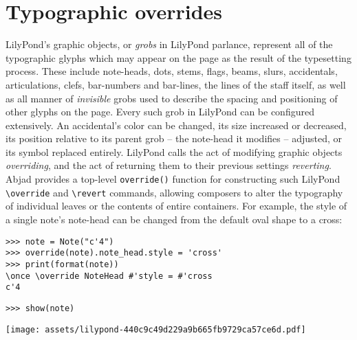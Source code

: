 \section{Typographic overrides}
\label{sec:typographic-overrides}

LilyPond's graphic objects, or \emph{grobs} in LilyPond parlance, represent all
of the typographic glyphs which may appear on the page as the result of the
typesetting process. These include note-heads, dots, stems, flags, beams,
slurs, accidentals, articulations, clefs, bar-numbers and bar-lines, the lines
of the staff itself, as well as all manner of \emph{invisible} grobs used
to describe the spacing and positioning of other glyphs on the page. Every such
grob in LilyPond can be configured extensively. An accidental's color can be
changed, its size increased or decreased, its position relative to its parent
grob -- the note-head it modifies -- adjusted, or its symbol replaced entirely.
LilyPond calls the act of modifying graphic objects \emph{overriding}, and the
act of returning them to their previous settings \emph{reverting}. Abjad
provides a top-level \texttt{override()} function for constructing such
LilyPond \texttt{\textbackslash{}override} and \texttt{\textbackslash{}revert}
commands, allowing composers to alter the typography of individual leaves or
the contents of entire containers. For example, the style of a single note's
note-head can be changed from the default oval shape to a cross:

\begin{comment}
<abjad>
note = Note("c'4")
override(note).note_head.style = 'cross'
print(format(note))
show(note)
</abjad>
\end{comment}

\begin{abjadbookoutput}
\begin{singlespacing}
\vspace{-0.5\baselineskip}
\begin{verbatim}
>>> note = Note("c'4")
>>> override(note).note_head.style = 'cross'
>>> print(format(note))
\once \override NoteHead #'style = #'cross
c'4
\end{verbatim}
\begin{verbatim}
>>> show(note)
\end{verbatim}
\noindent\texttt{[image: assets/lilypond-440c9c49d229a9b665fb9729ca57ce6d.pdf]}
\end{singlespacing}
\end{abjadbookoutput}

